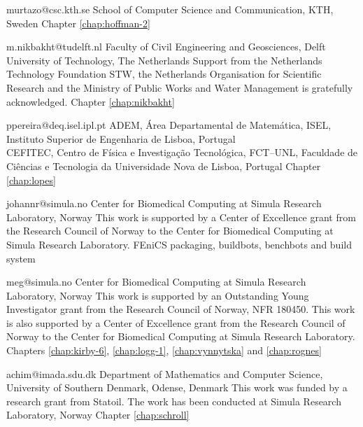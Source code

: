              {murtazo@csc.kth.se}
             {School of Computer Science and Communication, KTH, Sweden}
             {}
             {Chapter \ref{chap:hoffman-2}}

             {m.nikbakht@tudelft.nl}
             {Faculty of Civil Engineering and Geosciences,
             Delft University of Technology, The Netherlands}
             {Support from the Netherlands Technology Foundation STW,
              the Netherlands Organisation for Scientific Research
              and the Ministry of Public Works and Water Management is
              gratefully acknowledged.}
             {Chapter \ref{chap:nikbakht}}

             {ppereira@deq.isel.ipl.pt}
             {ADEM, \'{A}rea Departamental de Matem\'{a}tica,
              ISEL, Instituto Superior de Engenharia de Lisboa, Portugal \\
              CEFITEC, Centro de F\'{i}sica e Investiga\c{c}\~ao Tecnol\'{o}gica, FCT--UNL,
              Faculdade de Ci\^{e}ncias e Tecnologia da Universidade Nova de Lisboa, Portugal}
             {}
             {Chapter \ref{chap:lopes}}

             {johannr@simula.no}
             {Center for Biomedical Computing at Simula Research Laboratory, Norway}
             {This work is supported by a Center of Excellence grant
              from the Research Council of Norway to the Center for
              Biomedical Computing at Simula Research Laboratory.}
             {FEniCS packaging, buildbots, benchbots and build system}

             {meg@simula.no}
             {Center for Biomedical Computing at Simula Research Laboratory, Norway}
             {This work is supported by an Outstanding Young
              Investigator grant from the Research Council of Norway,
              NFR 180450. This work is also supported by a Center of
              Excellence grant from the Research Council of Norway to
              the Center for Biomedical Computing at Simula Research
              Laboratory.}
             {Chapters
              \ref{chap:kirby-6},
              \ref{chap:logg-1},
              \ref{chap:vynnytska} and
              \ref{chap:rognes}}

             {achim@imada.sdu.dk}
             {Department of Mathematics and Computer Science, University of Southern Denmark, Odense, Denmark}
             {This work was funded by a research grant from Statoil.
              The work has been conducted at Simula Research Laboratory, Norway}
             {Chapter \ref{chap:schroll}}

